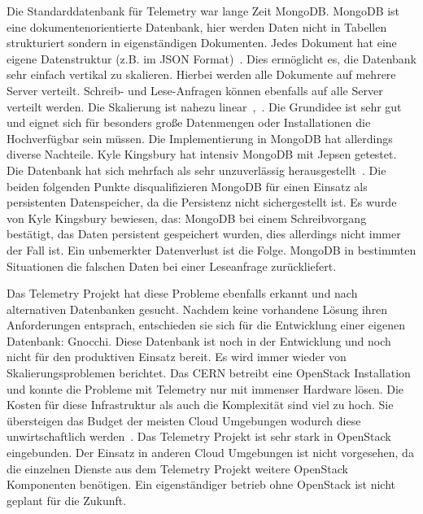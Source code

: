 \begin{outline}
  \1 Die Standarddatenbank für Telemetry war lange Zeit MongoDB. MongoDB ist
  eine dokumentenorientierte Datenbank, hier werden Daten nicht in Tabellen
  strukturiert sondern in eigenständigen Dokumenten. Jedes Dokument hat eine
  eigene Datenstruktur (z.B. im \gls{JSON}
  Format)~\cite{Dokumentenorientierte_Datenbank}. Dies ermöglicht es, die
  Datenbank sehr einfach vertikal zu skalieren. Hierbei werden alle Dokumente
  auf mehrere Server verteilt. Schreib- und Lese-Anfragen können ebenfalls auf
  alle Server verteilt werden. Die Skalierung ist nahezu
  linear~\cite{MongoDB_Architecture},~\cite{What_is_MongoDB}. Die Grundidee ist
  sehr gut und eignet sich für besonders große Datenmengen oder Installationen
  die Hochverfügbar sein müssen. Die Implementierung in MongoDB hat allerdings
  diverse Nachteile. Kyle Kingsbury hat intensiv MongoDB mit \gls{Jepsen}
  getestet. Die Datenbank hat sich mehrfach als sehr unzuverlässig
  herausgestellt~\cite{MongoDB_on_Jepsen}. Die beiden folgenden Punkte
  disqualifizieren MongoDB für einen Einsatz als persistenten  Datenspeicher,
  da die Persistenz nicht sichergestellt ist. Es wurde von Kyle Kingsbury
  bewiesen, das:
    \2 MongoDB bei einem Schreibvorgang bestätigt, das Daten persistent
    gespeichert wurden, dies allerdings nicht immer der Fall ist. Ein
    unbemerkter Datenverlust ist die Folge.
    \2 MongoDB in bestimmten Situationen die falschen Daten bei einer
    Leseanfrage zurückliefert.

  \1 Das Telemetry Projekt hat diese Probleme ebenfalls erkannt und nach
  alternativen Datenbanken gesucht. Nachdem keine vorhandene Lösung ihren
  Anforderungen entsprach, entschieden sie sich für die Entwicklung einer
  eigenen Datenbank: \gls{Gnocchi}. Diese Datenbank ist noch in der Entwicklung
  und noch nicht für den produktiven Einsatz bereit.
  \1 Es wird immer wieder von Skalierungsproblemen berichtet. Das CERN betreibt
  eine OpenStack Installation und konnte die Probleme mit Telemetry nur mit
  immenser Hardware lösen. Die Kosten für diese Infrastruktur als auch die
  Komplexität sind viel zu hoch. Sie übersteigen das Budget der meisten Cloud
  Umgebungen wodurch diese unwirtschaftlich werden~\cite{OpenStack_CERN}.
  \1 Das Telemetry Projekt ist sehr stark in OpenStack eingebunden. Der Einsatz
  in anderen Cloud Umgebungen ist nicht vorgesehen, da die einzelnen Dienste
  aus dem Telemetry Projekt weitere OpenStack Komponenten benötigen. Ein
  eigenständiger betrieb ohne OpenStack ist nicht geplant für die Zukunft.
\end{outline}

